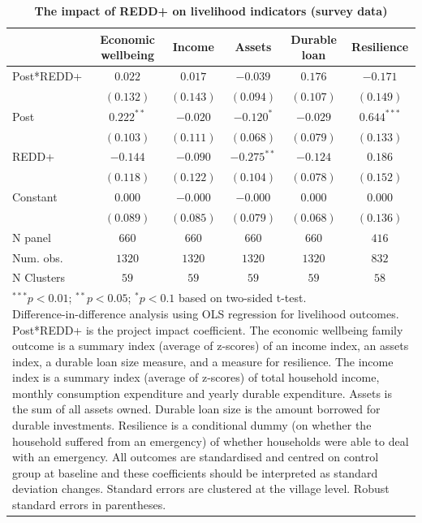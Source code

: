 \documentclass[
]{article}
\begin{document}
\begin{table}[h]
\caption{\textbf{The impact of REDD+ on livelihood indicators (survey data)}}
\begin{center}
\begin{tabular}{l c c c c c}
\hline
 & Economic wellbeing & Income & Assets & Durable loan & Resilience \\
\hline
Post*REDD+ & $0.022$      & $0.017$   & $-0.039$      & $0.176$   & $-0.171$      \\
           & $(0.132)$    & $(0.143)$ & $(0.094)$     & $(0.107)$ & $(0.149)$     \\
Post       & $0.222^{**}$ & $-0.020$  & $-0.120^{*}$  & $-0.029$  & $0.644^{***}$ \\
           & $(0.103)$    & $(0.111)$ & $(0.068)$     & $(0.079)$ & $(0.133)$     \\
REDD+      & $-0.144$     & $-0.090$  & $-0.275^{**}$ & $-0.124$  & $0.186$       \\
           & $(0.118)$    & $(0.122)$ & $(0.104)$     & $(0.078)$ & $(0.152)$     \\
Constant   & $0.000$      & $-0.000$  & $-0.000$      & $0.000$   & $0.000$       \\
           & $(0.089)$    & $(0.085)$ & $(0.079)$     & $(0.068)$ & $(0.136)$     \\
\hline
N panel    & $660$        & $660$     & $660$         & $660$     & $416$         \\
Num. obs.  & $1320$       & $1320$    & $1320$        & $1320$    & $832$         \\
N Clusters & $59$         & $59$      & $59$          & $59$      & $58$          \\
\hline
\multicolumn{6}{l}{\scriptsize{\parbox{.8\linewidth}{\vspace{2pt}$^{***}p<0.01$; $^{**}p<0.05$; $^{*}p<0.1$ based on two-sided t-test.\\
       Difference-in-difference analysis using OLS regression for livelihood outcomes. Post*REDD+ is the project impact coefficient. The economic wellbeing family outcome is a summary index (average of z-scores) of an income index, an assets index, a durable loan size measure, and a measure for resilience. The income index is a summary index (average of z-scores) of total household income, monthly consumption expenditure and yearly durable expenditure. Assets is the sum of all assets owned. Durable loan size is the amount borrowed for durable investments. Resilience is a conditional dummy (on whether the household suffered from an emergency) of whether households were able to deal with an emergency. All outcomes are standardised and centred on control group at baseline and these coefficients should be interpreted as standard deviation changes. Standard errors are clustered at the village level. Robust standard errors in parentheses.}}}
\end{tabular}
\label{table:coefficients}
\end{center}
\end{table}
\end{document}
